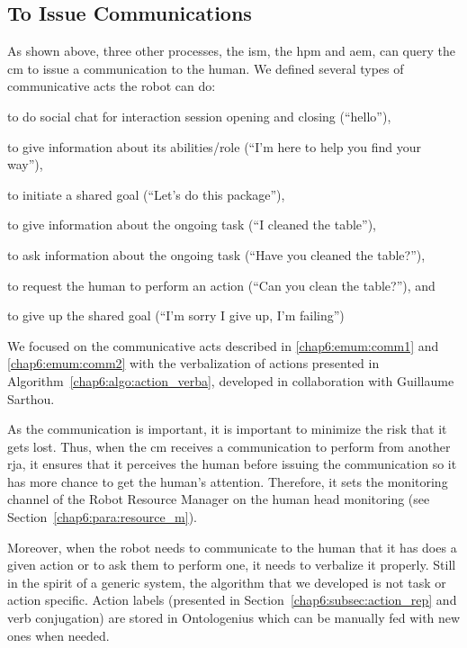\documentclass[a4paper,11pt,twoside]{StyleThese}
\begin{document}
\subsection{To  Issue Communications}
As shown above, three other processes, the \acrlong{ism}, the \acrlong{hpm} and \acrlong{aem}, can query the \acrshort{cm} to issue a communication to the human. We defined several types of communicative acts the robot can do:
\begin{bulletList}
	\item to do social chat for interaction session opening and closing (\eg ``hello''),
	\item to give information about its abilities/role (\eg ``I'm here to help you find your way''),
	\item to initiate a shared goal (\eg ``Let's do this package''),
	\item to give information about the ongoing task (\eg ``I cleaned the table''),\label{chap6:emum:comm1}
	\item to ask information about the ongoing task (\eg ``Have you cleaned the table?''),
	\item to request the human to perform an action (\eg ``Can you clean the table?''), and\label{chap6:emum:comm2}
	\item to give up the shared goal (\eg ``I'm sorry I give up, I'm failing'')
\end{bulletList}

We focused on the communicative acts described in \ref{chap6:emum:comm1} and \ref{chap6:emum:comm2} with the verbalization of actions presented in Algorithm~\ref{chap6:algo:action_verba}, developed in collaboration with Guillaume Sarthou. 

As the communication is important, it is important to minimize the risk that it gets lost. Thus, when the \acrshort{cm} receives a communication to perform from another \acrshort{rja}, it ensures that it perceives the human before issuing the communication so it has more chance to get the human's attention. Therefore, it sets the monitoring channel of the Robot Resource Manager on the human head monitoring (see Section~\ref{chap6:para:resource_m}).

Moreover, when the robot needs to communicate to the human that it has does a given action or to ask them to perform one, it needs to verbalize it properly. Still in the spirit of a generic system, the algorithm that we developed is not task or action specific. Action labels (presented in Section~\ref{chap6:subsec:action_rep} and verb conjugation) are stored in Ontologenius which can be manually fed with new ones when needed.
\end{document}

